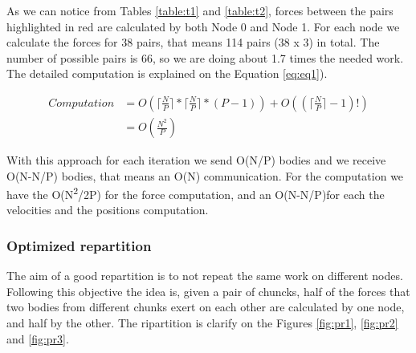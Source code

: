 \documentclass[a4paper]{article}
\begin{document}
As we can notice from Tables \ref{table:t1} and \ref{table:t2}, forces between the pairs highlighted in red are calculated by both Node 0 and Node 1. For each node we calculate the forces for 38 pairs, that means 114 pairs (38 x 3) in total. The number of possible pairs is 66, so we are doing about 1.7 times the needed work. 
The detailed computation is explained on the Equation \ref{eq:eq1}). 

\begin{equation} 
\label{eq:eq1}
\begin{split}
Computation & = O(\lceil\frac{N}{P}\rceil * \lceil\frac{N}{P}\rceil * (P-1)) + O((\lceil\frac{N}{P}\rceil-1)!)\\
 & = O(\frac{N^2}{P})
\end{split}
\end{equation}

With this approach for each iteration we send O(N/P) bodies and we receive O(N-N/P) bodies, that means an O(N) communication. For the computation we have the O(N\textsuperscript{2}/2P) for the force computation, and an O(N-N/P)for each the velocities and the positions computation.

\subsubsection{Optimized repartition}
\label{sec:opt_rep}
The aim of a good repartition is to not repeat the same work on different nodes. Following this objective the idea is, given a pair of chuncks, half of the forces that two bodies from different chunks exert on each other are calculated by one node, and half by the other. The ripartition is clarify on the Figures \ref{fig:pr1}, \ref{fig:pr2} and \ref{fig:pr3}.
\end{document}
